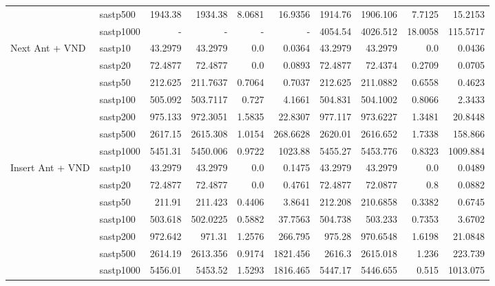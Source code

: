 \documentclass{article}
\begin{document}
\begin{table}[b!]
{\begin{tabular}{p{1.6cm}|l||rrrr|rrrr}
  & sastp500 & 1943.38 & 1934.38 & 8.0681 & 16.9356 &
               1914.76 & 1906.106 & 7.7125 & 15.2153 \\
  & sastp1000 & - & - & - & - &
                4054.54 & 4026.512 & 18.0058 & 115.5717 \\
    \hline
\multirow{7}{*}{\vbox{Next Ant + VND}}
 &  sastp10 & 43.2979 & 43.2979 & 0.0 & 0.0364 & 
              43.2979 & 43.2979 & 0.0 & 0.0436 \\ 
 &  sastp20 & 72.4877 & 72.4877 & 0.0 & 0.0893 &
              72.4877 & 72.4374 & 0.2709 & 0.0705 \\ 
 &  sastp50 & 212.625 & 211.7637 & 0.7064 & 0.7037 & 
              212.625 & 211.0882 & 0.6558 & 0.4623 \\ 
 &  sastp100 & 505.092 & 503.7117 & 0.727 & 4.1661 &
               504.831 & 504.1002 & 0.8066 & 2.3433 \\ 
 &  sastp200 & 975.133 & 972.3051 & 1.5835 & 22.8307 & 
               977.117 & 973.6227 & 1.3481 & 20.8448 \\ 
 &  sastp500 & 2617.15 & 2615.308 & 1.0154 & 268.6628 & 
               2620.01 & 2616.652 & 1.7338 & 158.866 \\ 
 &  sastp1000 & 5451.31 & 5450.006 & 0.9722 & 1023.88 &
                5455.27 & 5453.776 & 0.8323 & 1009.884 \\
    \hline
\multirow{7}{*}{\vbox{Insert Ant + VND}}
  & sastp10 & 43.2979 & 43.2979 & 0.0 & 0.1475 &
              43.2979 & 43.2979 & 0.0 & 0.0489 \\
  & sastp20 & 72.4877 & 72.4877 & 0.0 & 0.4761 &
              72.4877 & 72.0877 & 0.8 & 0.0882 \\
  & sastp50 & 211.91 & 211.423 & 0.4406 & 3.8641 &
              212.208 & 210.6858 & 0.3382 & 0.6745 \\
  & sastp100 & 503.618 & 502.0225 & 0.5882 & 37.7563 &
               504.738 & 503.233 & 0.7353 & 3.6702 \\
  & sastp200 & 972.642 & 971.31 & 1.2576 & 266.795 &
               975.28 & 970.6548 & 1.6198 & 21.0848 \\
  & sastp500 & 2614.19 & 2613.356 & 0.9174 & 1821.456 & 
               2616.3 & 2615.018 & 1.236 & 223.739 \\
  & sastp1000 & 5456.01 & 5453.52 & 1.5293 & 1816.465 &
                5447.17 & 5446.655 & 0.515 & 1013.075 \\
    \hline

  \end{tabular}
  }
\end{table}
\end{document}
